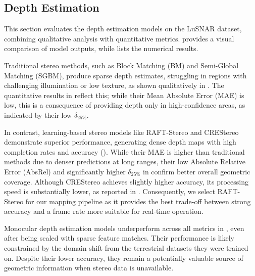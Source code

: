 \subsection{Depth Estimation}
This section evaluates the depth estimation models on the LuSNAR dataset, combining qualitative analysis with quantitative metrics.  provides a visual comparison of model outputs, while  lists the numerical results.

Traditional stereo methods, such as Block Matching (BM) and Semi-Global Matching (SGBM), produce sparse depth estimates, struggling in regions with challenging illumination or low texture, as shown qualitatively in . The quantitative results in  reflect this; while their Mean Absolute Error (MAE) is low, this is a consequence of providing depth only in high-confidence areas, as indicated by their low $\delta_{25\%}$.

In contrast, learning-based stereo models like RAFT-Stereo and CREStereo demonstrate superior performance, generating dense depth maps with high completion rates and accuracy (). While their MAE is higher than traditional methods due to denser predictions at long ranges, their low Absolute Relative Error (AbsRel) and significantly higher $\delta_{25\%}$ in  confirm better overall geometric coverage. Although CREStereo achieves slightly higher accuracy, its processing speed is substantially lower, as reported in . Consequently, we select RAFT-Stereo for our mapping pipeline as it provides the best trade-off between strong accuracy and a frame rate more suitable for real-time operation.

Monocular depth estimation models underperform across all metrics in , even after being scaled with sparse feature matches. Their performance is likely constrained by the domain shift from the terrestrial datasets they were trained on. Despite their lower accuracy, they remain a potentially valuable source of geometric information when stereo data is unavailable.

